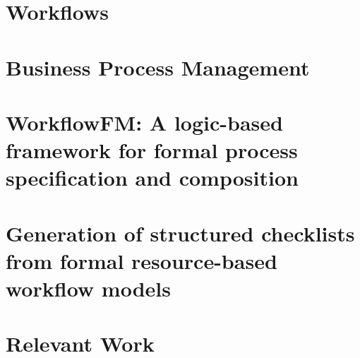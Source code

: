 \section{Workflows}


\section{Business Process Management}



\section{WorkflowFM: A logic-based framework for formal process specification and composition}


\section{Generation of structured checklists from formal resource-based workflow models}

\section{Relevant Work}
